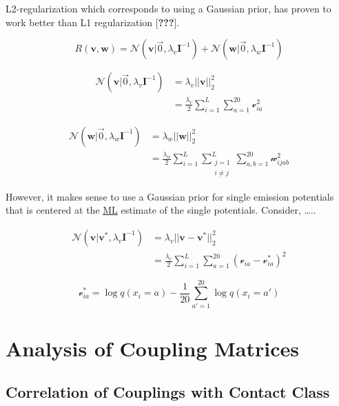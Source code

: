 \documentclass[12pt,a4paper,twoside]{book}
\newcommand{\I}{\mathbf{I}}
\renewcommand{\v}{\mathbf{v}}
\newcommand{\via}{\mathcal{v}_{ia}}
\newcommand{\w}{\mathbf{w}}
\newcommand{\wijab}{\mathcal{w}_{ijab}}
\theoremstyle{definition}
\theoremstyle{definition}
\theoremstyle{remark}
\begin{document}
L2-regularization which corresponds to using a Gaussian prior, has
proven to work better than L1 regularization {[}{\textbf{???}}{]}.

\begin{equation}
  R(\v, \w) = \mathcal{N}(\v |  \vec{0}, \lambda_v \I^{-1})  + \mathcal{N}(\w | \vec{0}, \lambda_w \I^{-1}) 
\end{equation}

\begin{align}
 \mathcal{N}(\v |  \vec{0}, \lambda_v \I^{-1})   &= \lambda_v ||\v||_2^2 \\
                                                &= \frac{\lambda_v}{2} \sum_{i=1}^L \sum_{a=1}^{20}  \via^2
\end{align}

\begin{align}
\mathcal{N}(\w | \vec{0}, \lambda_w \I^{-1}) &= \lambda_w ||\w||_2^2 \\
                                            &= \frac{\lambda_w}{2} \sum_{i=1}^L \sum_{\substack{j=1 \\ i \neq j}}^L  \sum_{a,b=1}^{20} \wijab^2
\end{align}

However, it makes sense to use a Gaussian prior for single emission
potentials that is centered at the \protect\hyperlink{abbrev}{ML}
estimate of the single potentials. Consider, \ldots{}..

\begin{align}
 \mathcal{N}(\v |  \v^{*}, \lambda_v \I^{-1}) &= \lambda_v ||\v - \v^{*}||_2^2 \\
                                               &= \frac{\lambda_v}{2} \sum_{i=1}^L \sum_{a=1}^{20}  (\via - \via^{*})^2   
\end{align}

\begin{equation}
  \via^* = \log q(x_i=a) - \frac{1}{20} \sum_{a'=1}^{20} \log q(x_i=a')
\end{equation}

\section{Analysis of Coupling
Matrices}\label{analysis-of-coupling-matrices}

\subsection{Correlation of Couplings with Contact
Class}\label{method-coupling-correlation}
\end{document}
